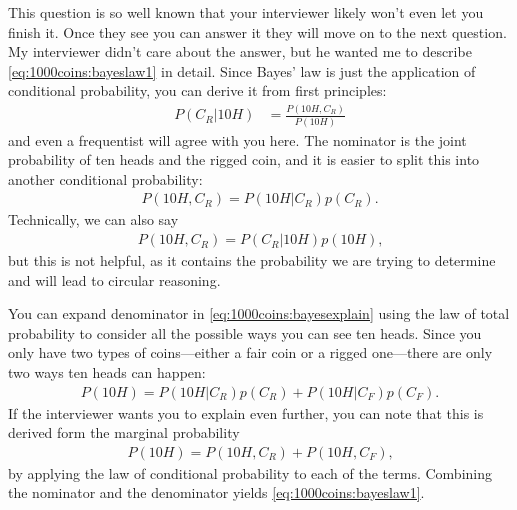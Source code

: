 \documentclass[11pt]{article}
\begin{document}
This question is so well known that your interviewer likely won't even let you finish it.
Once they see you can answer it they will move on to the next question.
My interviewer didn't care about the answer, but he wanted me to describe \eqref{eq:1000coins:bayeslaw1} in detail.
Since Bayes' law is just the application of conditional probability, you can derive it from first principles:
\begin{align}
\label{eq:1000coins:bayesexplain}
 P( C_{R} \vert 10H)
 &=
 \frac{
    P( 10H , C_{R} )
 }{
    P( 10H )
 }
\end{align}
and even a frequentist will agree with you here.
The nominator is the joint probability of ten heads and the rigged coin, and it is easier to split this into another conditional probability:
\begin{align*}
    P( 10H , C_{R} )
    =
    P( 10H \vert C_{R} ) p( C_{R} )
    \text{.}
\end{align*}
Technically, we can also say
\begin{align*}
    P( 10H , C_{R} )
    =
    P( C_{R} \vert 10H  ) p( 10H  )
    \text{,}
\end{align*}
but this is not helpful, as it contains the probability we are trying to determine and will lead to circular reasoning.

You can expand denominator in
\eqref{eq:1000coins:bayesexplain}
using the law of total probability to consider all the possible ways you can see ten heads.
Since you only have two types of coins---either a fair coin or a rigged one---there are only two ways ten heads can happen:
\begin{align*}
    P( 10H ) =
    P( 10H \vert C_{R} )p(C_{R})
    +
    P( 10H \vert C_{F} )p(C_{F})
    \text{.}
\end{align*}
If the interviewer wants you to explain even further, you can note that this is derived form the marginal probability
\begin{align*}
    P( 10H ) =
    P( 10H , C_{R} )
    +
    P( 10H , C_{F} )
    \text{,}
\end{align*}
by applying the law of conditional probability to each of the terms.
Combining the nominator and the denominator yields \eqref{eq:1000coins:bayeslaw1}.
\end{document}
